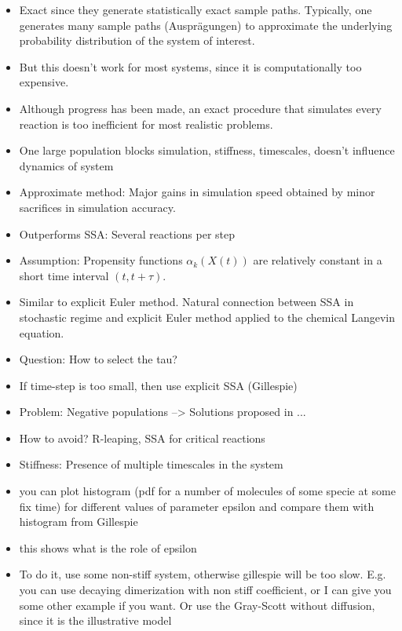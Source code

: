 \ifdebug
\begin{itemize}
\item Exact since they generate statistically exact sample paths. Typically, one generates many sample paths (Ausprägungen) to approximate the underlying probability distribution of the system of interest. 
\item But this doesn't work for most systems, since it is computationally too expensive. 
\item Although progress has been made, an exact procedure that simulates every reaction is too inefficient for most realistic problems. 
\item One large population blocks simulation, stiffness, timescales, doesn't influence dynamics of system

\item Approximate method: Major gains in simulation speed obtained by minor sacrifices in simulation accuracy. 
\item Outperforms SSA: Several reactions per step
\item Assumption: Propensity functions $\alpha_k(X(t))$ are relatively constant in a short time interval $(t,t+\tau)$. 
\item Similar to explicit Euler method. Natural connection between SSA in stochastic regime and explicit Euler method applied to the chemical Langevin equation. 
\item Question: How to select the tau?
\item If time-step is too small, then use explicit SSA (Gillespie)
\item Problem: Negative populations --> Solutions proposed in ...
\item How to avoid? R-leaping, SSA for critical reactions
\item Stiffness: Presence of multiple timescales in the system
\item you can plot histogram (pdf for a number of molecules of some specie at some fix time) for different values of parameter epsilon and compare them with histogram from Gillespie
\item this shows what is the role of epsilon
\item To do it, use some non-stiff system, otherwise gillespie will be too slow. E.g. you can use decaying dimerization with non stiff coefficient, or I can give you some other example if you want. Or use the Gray-Scott without diffusion, since it is the illustrative model
\end{itemize}
\fi

